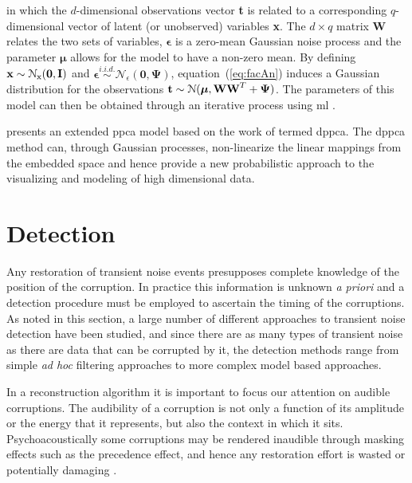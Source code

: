 in which the $d$-dimensional observations vector \textbf{t} is related to a corresponding $q$-dimensional vector of latent (or unobserved) variables \textbf{x}. The $d \times q$ matrix \textbf{W} relates the two sets of variables, $\boldsymbol\epsilon$ is a zero-mean Gaussian noise process and the parameter $\boldsymbol\mu$ allows for the model to have a non-zero mean. By defining $\textrm{\textbf{x}} \sim \mathcal{N}_\textrm{x}(\boldsymbol0,\textrm{\textbf{I}})$ and $\boldsymbol\epsilon \stackrel{i.i.d.}{\sim} \mathcal{N}_\epsilon(\boldsymbol0,\boldsymbol\Psi)$, equation~(\ref{eq:facAn}) induces a Gaussian distribution for the observations $\textrm{\textbf{t}} \sim \mathcal{N}(\boldsymbol\mu,\textrm{\textbf{W}}\textrm{\textbf{W}}^T + \boldsymbol\Psi)$. The parameters of this model can then be obtained through an iterative process using \gls{ml} \citep{Tipping1999}.

 \cite{Lawrence2005} presents an extended \gls{ppca} model based on the work of \cite{Tipping1999} termed \gls{dppca}. The \gls{dppca} method can, through Gaussian processes, non-linearize the linear mappings from the embedded space and hence provide a new probabilistic approach to the visualizing and modeling of high dimensional data.



\section{Detection}\label{sec:LitRev_Detection}
Any restoration of transient noise events presupposes complete knowledge of the position of the corruption. In practice this information is unknown \emph{a priori} and a detection procedure must be employed to ascertain the timing of the corruptions. As noted in this section, a large number of different approaches to transient noise detection have been studied, and since there are as many types of transient noise as there are data that can be corrupted by it, the detection methods range from simple \emph{ad hoc} filtering approaches to more complex model based approaches.

In a reconstruction algorithm it is important to focus our attention on audible corruptions. The audibility of a corruption is not only a function of its amplitude or the energy that it represents, but also the context in which it sits. Psychoacoustically some corruptions may be rendered inaudible through masking effects such as the precedence effect, and hence any restoration effort is wasted or potentially damaging \cite{Moore2003}.

